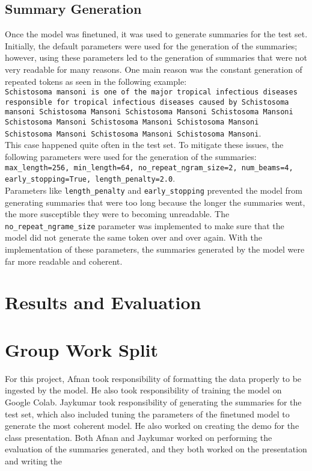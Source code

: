\documentclass[11pt,a4paper]{article}
\begin{document}
\subsection{Summary Generation}
\indent \indent Once the model was finetuned, it was used to generate summaries for the test set. Initially, the default parameters were used for the generation of the summaries; however, using these parameters led to the generation of summaries that were not very readable for many reasons. One main reason was the constant generation of repeated tokens as seen in the following example: \\
\texttt{Schistosoma mansoni is one of the major tropical infectious diseases responsible for tropical infectious diseases caused by Schistosoma mansoni Schistosoma Mansoni Schistosoma Mansoni Schistosoma Mansoni Schistosoma Mansoni Schistosoma Mansoni Schistosoma Mansoni Schistosoma Mansoni Schistosoma Mansoni Schistosoma Mansoni}. \\
This case happened quite often in the test set. To mitigate these issues, the following parameters were used for the generation of the summaries: \\
\texttt{max\_length=256, min\_length=64, no\_repeat\_ngram\_size=2, num\_beams=4, early\_stopping=True, length\_penalty=2.0}. \\
Parameters like \texttt{length\_penalty} and \texttt{early\_stopping} prevented the model from generating summaries that were too long because the longer the summaries went, the more susceptible they were to becoming unreadable. The \texttt{no\_repeat\_ngrame\_size} parameter was implemented to make sure that the model did not generate the same token over and over again. With the implementation of these parameters, the summaries generated by the model were far more readable and coherent.


\section{Results and Evaluation}




\appendix

\section{Group Work Split}
For this project, Afnan took responsibility of formatting the data properly to be ingested by the model. He also took responsibility of training the model on Google Colab. Jaykumar took responsibility of generating the summaries for the test set, which also included tuning the parameters of the finetuned model to generate the most coherent model. He also worked on creating the demo for the class presentation. Both Afnan and Jaykumar worked on performing the evaluation of the summaries generated, and they both worked on the presentation and writing the
\end{document}
